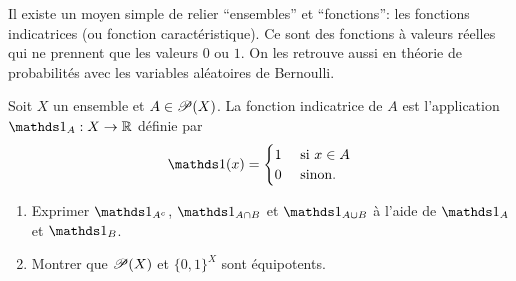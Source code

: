 \begin{nnremark}
    Il existe un moyen simple de relier ``ensembles'' et ``fonctions'': les fonctions indicatrices (ou fonction caractéristique). Ce sont des fonctions à valeurs réelles qui ne prennent que les valeurs \(0\) ou \(1\). On les retrouve aussi en théorie de probabilités avec les variables aléatoires de Bernoulli.
\end{nnremark}
\begin{td-exo}
    Soit \(X\) un ensemble et \(A\in\mathscr{P}(X)\). La fonction indicatrice de \(A\) est l'application \(\one_A:X\to\bbR\) définie par
    \[
    \one(x)=\begin{cases}
                        1 & \mbox{ si } x\in A \\
                        0 & \mbox{ sinon.}
    \end{cases}
    \]
    \begin{enumerate}
        \item Exprimer \(\one_{A^c}\), \(\one_{A\cap B}\) et \(\one_{A\cup B}\) à l'aide de \(\one_A\) et \(\one_B\).
        
        \item Montrer que \(\mathscr{P}(X)\) et \({\{0,1\}}^X\) sont équipotents.
    \end{enumerate}
\end{td-exo}
